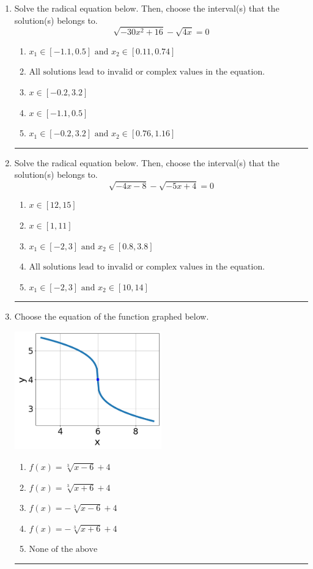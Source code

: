 \documentclass[14pt]{extbook}
\newcommand{\litem}[1]{\item#1\hspace*{-1cm}\rule{\textwidth}{0.4pt}}
\begin{document}
\begin{enumerate}
{\begin{enumerate}[label=\Alph*.]
\end{enumerate} }
\litem{
Solve the radical equation below. Then, choose the interval(s) that the solution(s) belongs to.\[ \sqrt{-30 x^2 + 16} - \sqrt{4 x} = 0 \]\begin{enumerate}[label=\Alph*.]
\item \( x_1 \in [-1.1, 0.5] \text{ and } x_2 \in [0.11,0.74] \)
\item \( \text{All solutions lead to invalid or complex values in the equation.} \)
\item \( x \in [-0.2,3.2] \)
\item \( x \in [-1.1,0.5] \)
\item \( x_1 \in [-0.2, 3.2] \text{ and } x_2 \in [0.76,1.16] \)

\end{enumerate} }
\litem{
Solve the radical equation below. Then, choose the interval(s) that the solution(s) belongs to.\[ \sqrt{-4 x - 8} - \sqrt{-5 x + 4} = 0 \]\begin{enumerate}[label=\Alph*.]
\item \( x \in [12,15] \)
\item \( x \in [1,11] \)
\item \( x_1 \in [-2, 3] \text{ and } x_2 \in [0.8,3.8] \)
\item \( \text{All solutions lead to invalid or complex values in the equation.} \)
\item \( x_1 \in [-2, 3] \text{ and } x_2 \in [10,14] \)

\end{enumerate} }
\litem{
Choose the equation of the function graphed below.
\begin{center}
    \includegraphics[width=0.5\textwidth]{../Figures/radicalGraphToEquationC.png}
\end{center}
\begin{enumerate}[label=\Alph*.]
\item \( f(x) = \sqrt[3]{x - 6} + 4 \)
\item \( f(x) = \sqrt[3]{x + 6} + 4 \)
\item \( f(x) = - \sqrt[3]{x - 6} + 4 \)
\item \( f(x) = - \sqrt[3]{x + 6} + 4 \)
\item \( \text{None of the above} \)

\end{enumerate} }
\end{enumerate}
\end{document}
